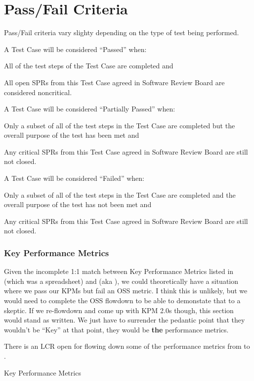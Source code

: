 
\section{Pass/Fail Criteria}

Pass/Fail criteria vary slighty depending on the type of test being performed.


A Test Case will be considered ``Passed'' when:
\begin{itemize_single}
\item All of the test steps of the Test Case are completed and
\item All open SPRs from this Test Case agreed in Software Review Board are considered noncritical.
\end{itemize_single}

A Test Case will be considered ``Partially Passed'' when:
\begin{itemize_single}
\item Only a subset of all of the test steps in the Test Case are completed but the overall purpose of the test has been met and
\item Any critical SPRs from this Test Case agreed in Software Review Board are still not closed.
\end{itemize_single}

A Test Case will be considered ``Failed'' when:
\begin{itemize_single}
\item Only a subset of all of the test steps in the Test Case are completed and the overall purpose of the test has not been met and
\item Any critical SPRs from this Test Case agreed in Software Review Board are still not closed.
\end{itemize_single}

\subsubsection{Key Performance Metrics}

\begin{note}
Given the incomplete 1:1 match between Key Performance Metrics listed in  (which was a spreadsheet) and  (aka \OSS), we could theoretically have a situation where we pass our KPMs but fail an OSS metric. I think this is unlikely, but we would need to complete the OSS flowdown to be able to demonstate that to a skeptic. If we re-flowdown and come up with KPM 2.0s though, this section would stand as written. We just have to surrender the pedantic point that they wouldn't be ``Key'' at that point, they would be \textbf{the} performance metrics.
\end{note}

\begin{note}
  There is an LCR open for flowing down some of the performance metrics from \LSR to \OSS.
\end{note}

Key Performance Metrics
